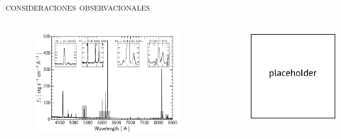 \documentclass[xcolor=dvipsnames,fleqn,hyperref={colorlinks,citecolor=black,linkcolor=black,urlcolor=black}]{beamer}
\begin{document}
\begin{frame}{\textsc{consideraciones observacionales}}
\begin{columns}
\begin{figure}
\includegraphics[scale=0.61]{img/hayes2016-2}
\end{figure}

\begin{figure}
\includegraphics[scale=0.5]{img/placeholder}
\end{figure}
\end{columns}

\end{frame}
\end{document}
